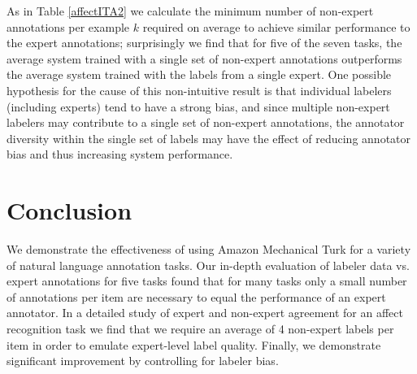 \documentclass[11pt]{article}
\begin{document}
As in Table \ref{affectITA2} we calculate the minimum number of
non-expert annotations per example $k$ required on average to achieve
similar performance to the expert annotations; surprisingly we find
that for five of the seven tasks, the average system trained with
a single set of non-expert annotations outperforms the average
system trained with the labels from a single expert.  One possible
hypothesis for the cause of this non-intuitive result is that
individual labelers (including experts) tend to have a strong bias,
and since multiple non-expert labelers may contribute to a single
set of non-expert annotations, the annotator diversity within the
single set of labels may have the effect of reducing annotator bias
and thus increasing system performance.
\vspace*{-0.1in}
\section{Conclusion}

We demonstrate the effectiveness of using Amazon Mechanical Turk
for a variety of natural language annotation tasks.  Our
in-depth evaluation of labeler data vs. expert annotations for five
tasks found that for many tasks only a small number of 
annotations per item are necessary to equal the performance of an expert annotator.  
In a detailed study of expert
and non-expert agreement for an affect recognition task we find
that we require an average of 4 non-expert labels per item in order
to emulate expert-level label quality. Finally, we demonstrate significant improvement by controlling for labeler bias.


\end{document}
